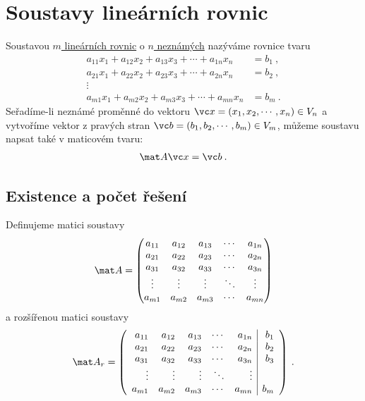 \section*{Soustavy lineárních rovnic}

Soustavou \underline{$m$ lineárních rovnic} o \underline{$n$ neznámých} nazýváme rovnice tvaru
\begin{align}
    a_{11} x_1 + a_{12} x_2 + a_{13} x_3 + \cdots + a_{1n} x_n &= b_1 \:, \\
    a_{21} x_1 + a_{22} x_2 + a_{23} x_3 + \cdots + a_{2n} x_n &= b_2 \:, \\
    \vdots \\
    a_{m1} x_1 + a_{m2} x_2 + a_{m3} x_3 + \cdots + a_{mn} x_n &= b_m \:.
\end{align}
Seřadíme-li neznámé proměnné do vektoru $ \vc x = (x_1, x_2, \cdots, x_n) \in V_n$ a vytvoříme vektor z pravých stran \newline$\vc b = (b_1, b_2, \cdots, b_m) \in V_m$, můžeme soustavu napsat také v maticovém tvaru:
\begin{align}
    \mat A \vc x = \vc b \:.
\end{align}

\subsection*{Existence a počet řešení}

Definujeme matici soustavy \begin{align}
    \mat A = \begin{pmatrix}
        a_{11} & a_{12} & a_{13} & \cdots & a_{1n} \\
        a_{21} & a_{22} & a_{23} & \cdots & a_{2n} \\
        a_{31} & a_{32} & a_{33} & \cdots & a_{3n} \\
        \vdots & \vdots & \vdots & \ddots & \vdots \\
        a_{m1} & a_{m2} & a_{m3} & \cdots & a_{mn} 
    \end{pmatrix}
\end{align}
a rozšířenou matici soustavy \begin{align}
    \mat A_r = 
    \left(\begin{array}{rrrrr|r}
        a_{11} & a_{12} & a_{13} & \cdots & a_{1n} & b_1\\
        a_{21} & a_{22} & a_{23} & \cdots & a_{2n} & b_2\\
        a_{31} & a_{32} & a_{33} & \cdots & a_{3n} & b_3\\
        \vdots & \vdots & \vdots & \ddots & \vdots & \\
        a_{m1} & a_{m2} & a_{m3} & \cdots & a_{mn} & b_m \\
        \end{array}\right) \:.
\end{align}

